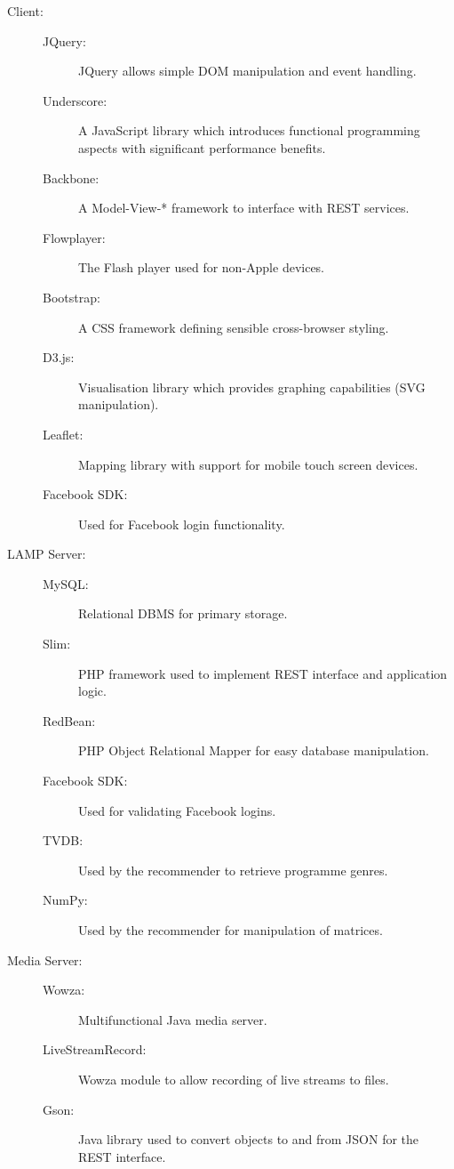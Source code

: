 \begin{description}
	\item[Client:] \hfill
		\begin{description}
			\item[JQuery:] JQuery allows simple DOM manipulation and event handling.
			\item[Underscore:] A JavaScript library which introduces functional programming aspects with significant performance benefits.
			\item[Backbone:] A Model-View-* framework to interface with REST services.
			\item[Flowplayer:] The Flash player used for non-Apple devices.
			\item[Bootstrap:] A CSS framework defining sensible cross-browser styling.
			\item[D3.js:] Visualisation library which provides graphing capabilities (SVG manipulation).
			\item[Leaflet:] Mapping library with support for mobile touch screen devices.
			\item[Facebook SDK:] Used for Facebook login functionality.
		\end{description}
	\item[LAMP Server:] \hfill
		\begin{description}
			\item[MySQL:] Relational DBMS for primary storage.
			\item[Slim:] PHP framework used to implement REST interface and application logic.
			\item[RedBean:] PHP Object Relational Mapper for easy database manipulation.
			\item[Facebook SDK:] Used for validating Facebook logins.
			\item[TVDB:] Used by the recommender to retrieve programme genres.
			\item[NumPy:] Used by the recommender for manipulation of matrices.
		\end{description}
	\item[Media Server:] \hfill
		\begin{description}
			\item[Wowza:] Multifunctional Java media server.
			\item[LiveStreamRecord:] Wowza module to allow recording of live streams to files.
			\item[Gson:] Java library used to convert objects to and from JSON for the REST interface.
		\end{description}
\end{description}


